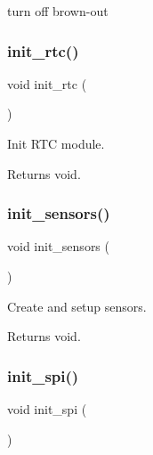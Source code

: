 turn off brown-\/out \mbox{\label{i2c-th_8h_a88533ad02465ce52d4e6de7b2095ec32}} 
\subsubsection{\texorpdfstring{init\+\_\+rtc()}{init\_rtc()}}
{\footnotesize\ttfamily void init\+\_\+rtc (\begin{DoxyParamCaption}{ }\end{DoxyParamCaption})}



Init R\+TC module. 

\begin{DoxyReturn}{Returns}
void. 
\end{DoxyReturn}
\mbox{\label{i2c-th_8h_ad7577ba7f06f417a019b69da8682ede5}} 
\subsubsection{\texorpdfstring{init\+\_\+sensors()}{init\_sensors()}}
{\footnotesize\ttfamily void init\+\_\+sensors (\begin{DoxyParamCaption}{ }\end{DoxyParamCaption})}



Create and setup sensors. 

\begin{DoxyReturn}{Returns}
void. 
\end{DoxyReturn}
\mbox{\label{i2c-th_8h_a4454f968b2402a0e61deb15ab2571dab}} 
\subsubsection{\texorpdfstring{init\+\_\+spi()}{init\_spi()}}
{\footnotesize\ttfamily void init\+\_\+spi (\begin{DoxyParamCaption}{ }\end{DoxyParamCaption})}



